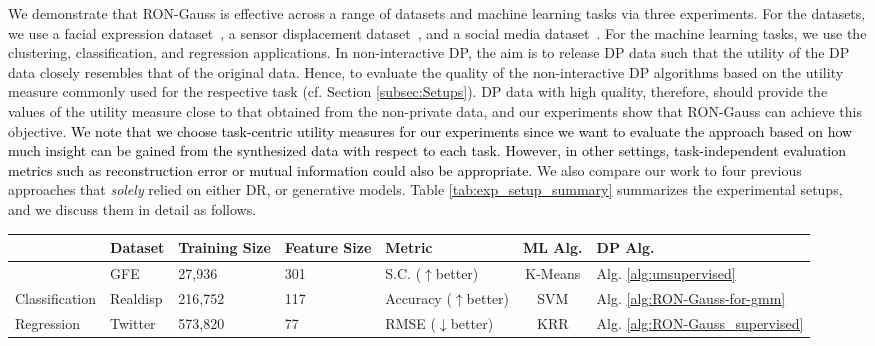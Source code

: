 \documentclass[USenglish,oneside,twocolumn]{article}
\providecommand{\tabularnewline}{\\}
\theoremstyle{definition}
\theoremstyle{remark}
\theoremstyle{plain}
\theoremstyle{plain}
\newcommand{\chang}{\textcolor{black}}
\begin{document}
We demonstrate that RON-Gauss is effective across a range of datasets
and machine learning tasks via three experiments. For the datasets,
we use a facial expression dataset~\cite{RefWorks:230}, a sensor
displacement dataset~\cite{RefWorks:207,RefWorks:358}, and a social
media dataset~\cite{RefWorks:240}. For the machine learning tasks,
we use the clustering, classification, and regression applications. In non-interactive DP, the aim is to release DP data such that the utility of the DP data closely resembles that of the original data. Hence, to evaluate the quality of the non-interactive DP algorithms based on the utility measure commonly used for the respective task (cf. Section \ref{subsec:Setups}). DP data with high quality, therefore, should provide the values of the utility measure close to that obtained from the non-private data, and our experiments show that RON-Gauss can achieve this objective. \chang{We note that we choose task-centric utility measures for our experiments since we want to evaluate the approach based on how much insight can be gained from the synthesized data with respect to each task. However, in other settings, task-independent evaluation metrics such as reconstruction error or mutual information could also be appropriate.} We also compare our work to four previous approaches that \emph{solely}
relied on either DR, or generative models. Table
\ref{tab:exp_setup_summary} summarizes the experimental setups, and
we discuss them in detail as follows.

\begin{table*}
\begin{centering}
\begin{tabular}{>{\centering}p{2.2cm}|>{\centering}p{2.5cm}|>{\centering}p{2cm}|>{\centering}p{2cm}|>{\centering}p{2.8cm}|c|>{\centering}p{1.5cm}}
\hline 
{Exp. } & {Dataset } & {Training Size } & {Feature Size } & {Metric } & {ML Alg. } & {DP Alg. }\tabularnewline
\hline 
\hline 
{Clustering } & {GFE \cite{RefWorks:230}} & {27,936 } & {301 } & {S.C. ($\uparrow$better) } & {K-Means } & {Alg. \ref{alg:unsupervised} }\tabularnewline
\hline 
{Classification } & {Realdisp \cite{RefWorks:207,RefWorks:358}} & {216,752 } & {117 } & {Accuracy ($\uparrow$better) } & {SVM } & {Alg. \ref{alg:RON-Gauss-for-gmm} }\tabularnewline
\hline 
{Regression } & {Twitter \cite{RefWorks:240}} & {573,820 } & {77 } & {RMSE ($\downarrow$better) } & {KRR } & {Alg. \ref{alg:RON-Gauss_supervised} }\tabularnewline
\hline 
\end{tabular}
\par\end{centering}
\caption{Summary of the experimental setups of the three experiments. }\label{tab:exp_setup_summary}
\vspace{-1em}
\end{table*}
\end{document}
